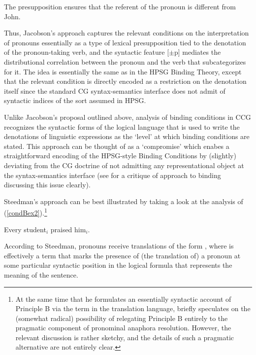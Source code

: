 \documentclass[output=paper]{langsci/langscibook}
\begin{document}
\noindent
The presupposition  %
{}%
ensures that the
referent of the pronoun is different from John.

Thus, Jacobson's approach captures the relevant conditions on the
interpretation of pronouns essentially as a type of lexical
presupposition tied to the denotation of the pronoun-taking verb,
and the syntactic feature [$\pm$p] mediates the
distributional correlation between the pronoun and the verb that
subcategorizes for it. The idea is
essentially the same as in the HPSG Binding Theory, except that the
relevant condition is directly encoded as a restriction on the
denotation itself since the standard CG syntax-semantics interface
does not admit of syntactic indices of the sort assumed in HPSG.

Unlike Jacobson's proposal outlined above, 
analysis of binding conditions in CCG recognizes the syntactic forms
of the logical language that is used to write the denotations of
linguistic expressions as the `level' at which binding conditions are
stated. This approach can be thought of as a `compromise' which enabes
a straightforward encoding of the HPSG-style Binding Conditions by
(slightly) deviating from the CG doctrine of not admitting any
representational object at the syntax-semantics interface (see
\citet{dowty96} for a critique of 
approach to binding discussing this issue clearly).

Steedman's approach can be best illustrated by taking a look at the analysis of
(\ref{condBex2}).\footnote{At the same time that
he formulates an essentially syntactic account of Principle B via the
term  in the translation language, \citet{Steedman97a} briefly
speculates on the (somewhat radical) possibility of relegating Principle B entirely to
the pragmatic component of pronominal anaphora resolution. However,
the relevant discussion is rather sketchy, and the details of such a
pragmatic alternative are not entirely clear.}

\begin{exe}
 \ex\label{condBex2}
  \bad Every student\ensuremath{_i} praised him\ensuremath{_i}. 
\end{exe}
According to Steedman, pronouns receive translations of the form
, %
{}%
where  is effectively a term that marks the
presence of (the translation of) a pronoun at some particular
syntactic position in the logical formula that represents the meaning
of the sentence.
\end{document}
